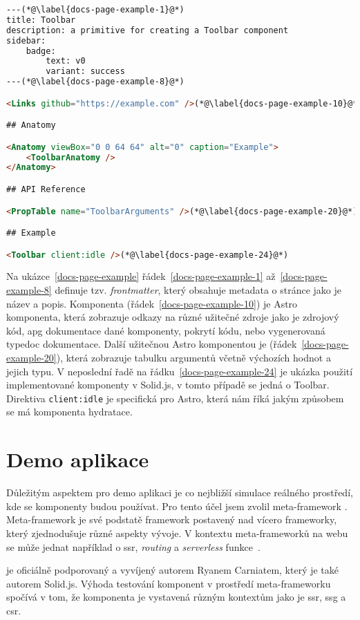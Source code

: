 \begin{lstlisting}[caption={Ukázka stránky dokumentace psané v MDX}, label={docs-page-example}, language=html]
---(*@\label{docs-page-example-1}@*)
title: Toolbar
description: a primitive for creating a Toolbar component
sidebar:
    badge:
        text: v0
        variant: success
---(*@\label{docs-page-example-8}@*)

<Links github="https://example.com" />(*@\label{docs-page-example-10}@*)

## Anatomy

<Anatomy viewBox="0 0 64 64" alt="0" caption="Example">
    <ToolbarAnatomy />
</Anatomy>

## API Reference

<PropTable name="ToolbarArguments" />(*@\label{docs-page-example-20}@*)

## Example

<Toolbar client:idle />(*@\label{docs-page-example-24}@*)
\end{lstlisting}

Na ukázce~\ref{docs-page-example} řádek~\ref{docs-page-example-1} až~\ref{docs-page-example-8} definuje tzv. \textit{frontmatter}, který obsahuje metadata o stránce jako je název a popis.
Komponenta  (řádek~\ref{docs-page-example-10}) je Astro komponenta, která zobrazuje odkazy na různé užitečné zdroje jako je zdrojový kód, \gls{apg} dokumentace dané komponenty, pokrytí kódu, nebo vygenerovaná typedoc dokumentace.
Další užitečnou Astro komponentou je  (řádek~\ref{docs-page-example-20}), která zobrazuje tabulku argumentů včetně výchozích hodnot a jejich typu.
V neposlední řadě na řádku~\ref{docs-page-example-24} je ukázka použití implementované komponenty v Solid.js, v tomto případě se jedná o Toolbar.
Direktiva \texttt{client:idle} je specifická pro Astro, která nám říká jakým způsobem se má komponenta \gls{hydratace}.

\section{Demo aplikace}

Důležitým aspektem pro demo aplikaci je co nejbližší simulace reálného prostředí, kde se komponenty budou používat.
Pro tento účel jsem zvolil meta-framework . Meta-framework je své podstatě framework postavený nad vícero frameworky, který zjednodušuje různé aspekty vývoje.
V kontextu meta-frameworků na webu se může jednat například o \gls{ssr}, \textit{routing} a \textit{serverless} funkce~\cite{prismic-metaframework}.

 je oficiálně podporovaný a vyvíjený autorem Ryanem Carniatem, který je také autorem Solid.js.
Výhoda testování komponent v prostředí meta-frameworku spočívá v tom, že komponenta je vystavená různým kontextům jako je \gls{ssr}, \gls{ssg} a \gls{csr}.
